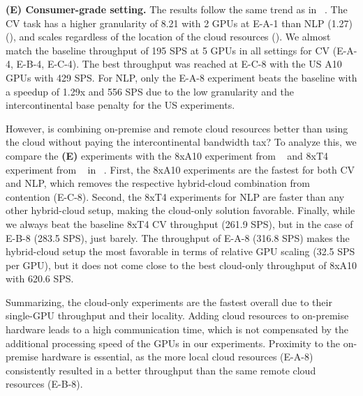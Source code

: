 \textbf{(E) Consumer-grade setting.} The results follow the same trend as in ~.
The CV task has a higher granularity of 8.21 with 2 GPUs at E-A-1 than NLP (1.27) (), and scales regardless of the location of the cloud resources ().
We almost match the baseline throughput of 195 SPS at 5 GPUs in all settings for CV (E-A-4, E-B-4, E-C-4).
The best throughput was reached at E-C-8 with the US A10 GPUs with 429 SPS.
For NLP, only the E-A-8 experiment beats the baseline with a speedup of 1.29x and 556 SPS due to the low granularity and the intercontinental base penalty for the US experiments.

However, is combining on-premise and remote cloud resources better than using the cloud without paying the intercontinental bandwidth tax?
To analyze this, we compare the \textbf{(E)} experiments with the 8xA10 experiment from ~ and 8xT4 experiment from ~ in ~.
First, the 8xA10 experiments are the fastest for both CV and NLP, which removes the respective hybrid-cloud combination from contention (E-C-8).
Second, the 8xT4 experiments for NLP are faster than any other hybrid-cloud setup, making the cloud-only solution favorable.
Finally, while we always beat the baseline 8xT4 CV throughput (261.9 SPS), but in the case of E-B-8 (283.5 SPS), just barely.
The throughput of E-A-8 (316.8 SPS) makes the hybrid-cloud setup the most favorable in terms of relative GPU scaling (32.5 SPS per GPU), but it does not come close to the best cloud-only throughput of 8xA10 with 620.6 SPS.

Summarizing, the cloud-only experiments are the fastest overall due to their single-GPU throughput and their locality.
Adding cloud resources to on-premise hardware leads to a high communication time, which is not compensated by the additional processing speed of the GPUs in our experiments.
Proximity to the on-premise hardware is essential, as the more local cloud resources (E-A-8) consistently resulted in a better throughput than the same remote cloud resources (E-B-8).


